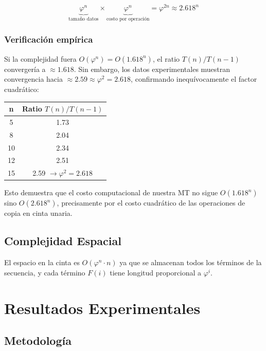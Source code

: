\documentclass[12pt,a4paper]{article}
\begin{document}
\begin{equation}
\underbrace{\varphi^n}_{\text{tamaño datos}} \times \underbrace{\varphi^n}_{\text{costo por operación}} = \varphi^{2n} \approx 2.618^n
\end{equation}

\subsubsection{Verificación empírica}

Si la complejidad fuera $O(\varphi^n) = O(1.618^n)$, el ratio $T(n)/T(n-1)$ convergería a $\approx 1.618$. Sin embargo, los datos experimentales muestran convergencia hacia $\approx 2.59 \approx \varphi^2 = 2.618$, confirmando inequívocamente el factor cuadrático:

\begin{center}
\begin{tabular}{cc}
\toprule
\textbf{n} & \textbf{Ratio $T(n)/T(n-1)$} \\
\midrule
5  & 1.73 \\
8  & 2.04 \\
10 & 2.34 \\
12 & 2.51 \\
15 & 2.59 $\longrightarrow \varphi^2 = 2.618$ \\
\bottomrule
\end{tabular}
\end{center}

Esto demuestra que el costo computacional de nuestra MT no sigue $O(1.618^n)$ sino $O(2.618^n)$, precisamente por el costo cuadrático de las operaciones de copia en cinta unaria.

\subsection{Complejidad Espacial}

El espacio en la cinta es $O(\varphi^n \cdot n)$ ya que se almacenan todos los términos de la secuencia, y cada término $F(i)$ tiene longitud proporcional a $\varphi^i$.

\newpage

\section{Resultados Experimentales}

\subsection{Metodología}
\end{document}
